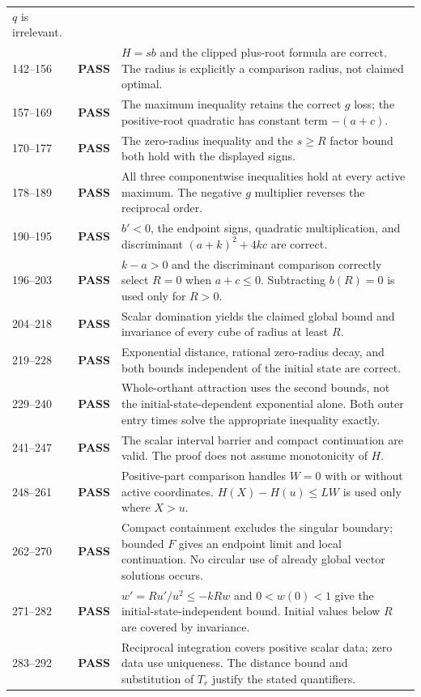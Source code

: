 \documentclass[11pt]{article}
\newcommand{\pass}{\textbf{PASS}}
\begin{document}
\begin{longtable}{@{}P{0.12\textwidth}P{0.12\textwidth}P{0.71\textwidth}@{}}
$q$ is irrelevant. \\
142--156 & \pass & $H=s b$ and the clipped plus-root formula are correct.
The radius is explicitly a comparison radius, not claimed optimal. \\
157--169 & \pass & The maximum inequality retains the correct $g$ loss;
the positive-root quadratic has constant term $-(a+c)$. \\
170--177 & \pass & The zero-radius inequality and the $s\geq R$ factor
bound both hold with the displayed signs. \\
178--189 & \pass & All three componentwise inequalities hold at every
active maximum. The negative $g$ multiplier reverses the reciprocal order. \\
190--195 & \pass & $b'<0$, the endpoint signs, quadratic multiplication,
and discriminant $(a+k)^2+4kc$ are correct. \\
196--203 & \pass & $k-a>0$ and the discriminant comparison correctly
select $R=0$ when $a+c\leq0$. Subtracting $b(R)=0$ is used only for $R>0$. \\
204--218 & \pass & Scalar domination yields the claimed global bound and
invariance of every cube of radius at least $R$. \\
219--228 & \pass & Exponential distance, rational zero-radius decay, and
both bounds independent of the initial state are correct. \\
229--240 & \pass & Whole-orthant attraction uses the second bounds, not
the initial-state-dependent exponential alone. Both outer entry times solve
the appropriate inequality exactly. \\
241--247 & \pass & The scalar interval barrier and compact continuation
are valid. The proof does not assume monotonicity of $H$. \\
248--261 & \pass & Positive-part comparison handles $W=0$ with or without
active coordinates. $H(X)-H(u)\leq LW$ is used only where $X>u$. \\
262--270 & \pass & Compact containment excludes the singular boundary;
bounded $F$ gives an endpoint limit and local continuation. No circular
use of already global vector solutions occurs. \\
271--282 & \pass & $w'=Ru'/u^2\leq-kRw$ and $0<w(0)<1$ give the
initial-state-independent bound. Initial values below $R$ are covered by
invariance. \\
283--292 & \pass & Reciprocal integration covers positive scalar data;
zero data use uniqueness. The distance bound and substitution of $T_r$
justify the stated quantifiers. \\

\end{longtable}
\end{document}
